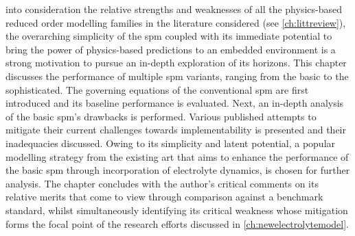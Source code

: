 

 into consideration the  relative strengths and weaknesses
of  all the  physics-based reduced  order modelling  families in  the literature
considered  (see  \cref{ch:littreview}),  the   overarching  simplicity  of  the
\gls{spm}  coupled  with   its  immediate  potential  to  bring   the  power  of
physics-based predictions to  an embedded environment is a  strong motivation to
pursue  an in-depth  exploration of  its  horizons. This  chapter discusses  the
performance  of multiple  \gls{spm}  variants,  ranging from  the  basic to  the
sophisticated. The governing  equations of the conventional  \gls{spm} are first
introduced and its baseline performance is evaluated. Next, an in-depth analysis
of the basic  \gls{spm}'s drawbacks is performed. Various  published attempts to
mitigate  their current  challenges  towards implementability  is presented  and
their  inadequacies discussed.  Owing to  its simplicity  and latent  potential,
a  popular  modelling strategy  from  the  existing  art  that aims  to  enhance
the  performance of  the basic  \gls{spm} through  incorporation of  electrolyte
dynamics,  is  chosen for  further  analysis.  The  chapter concludes  with  the
author's critical  comments on  its relative  merits that  come to  view through
comparison against  a benchmark standard, whilst  simultaneously identifying its
critical weakness whose mitigation forms the focal point of the research efforts
discussed in \cref{ch:newelectrolytemodel}.

